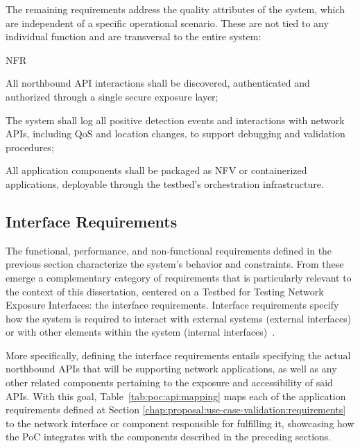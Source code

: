 The remaining requirements address the quality attributes of the system, which are independent of a specific operational scenario. These are not tied to any individual function and are transversal to the entire system:

\begin{custenumerate}{NFR}
    \setcounter{enumi}{5}
    \item \label{enum:nfr:secure-exposure} All northbound \acs{API} interactions shall be discovered, authenticated and authorized through a single secure exposure layer;
    \item \label{enum:nfr:logging} The system shall log all positive detection events and interactions with network \acsp{API}, including \acs{QoS} and location changes, to support debugging and validation procedures;
    \item \label{enum:nfr:packaging} All application components shall be packaged as \acs{NFV} or containerized applications, deployable through the testbed's orchestration infrastructure.
\end{custenumerate}

\subsection{Interface Requirements}

The functional, performance, and non-functional requirements defined in the previous section characterize the system's behavior and constraints. From these emerge a complementary category of requirements that is particularly relevant to the context of this dissertation, centered on a Testbed for Testing Network Exposure Interfaces: the interface requirements. Interface requirements specify how the system is required to interact with external systems (external interfaces) or with other elements within the system (internal interfaces)~\cite{ISORequirementsEngineering}.

More specifically, defining the interface requirements entails specifying the actual northbound \acsp{API} that will be supporting network applications, as well as any other related components pertaining to the exposure and accessibility of said \acsp{API}. With this goal, Table~\ref{tab:poc:api:mapping} maps each of the application requirements defined at Section \ref{chap:proposal:use-case-validation:requirements} to the network interface or component responsible for fulfilling it, showcasing how the \acs{PoC} integrates with the components described in the preceding sections.

